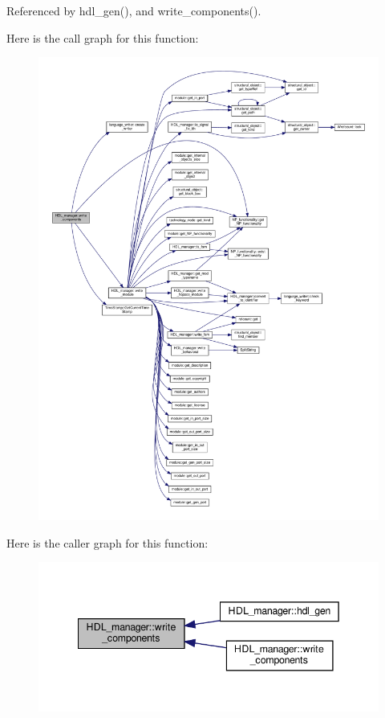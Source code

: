 Referenced by hdl\+\_\+gen(), and write\+\_\+components().

Here is the call graph for this function\+:
\nopagebreak
\begin{figure}[H]
\begin{center}
\leavevmode
\includegraphics[width=350pt]{d7/d32/classHDL__manager_aaaf408848659946f286bce9799a7da8a_cgraph}
\end{center}
\end{figure}
Here is the caller graph for this function\+:
\nopagebreak
\begin{figure}[H]
\begin{center}
\leavevmode
\includegraphics[width=342pt]{d7/d32/classHDL__manager_aaaf408848659946f286bce9799a7da8a_icgraph}
\end{center}
\end{figure}
\mbox{\label{classHDL__manager_a0bc13e709384a03c49b4130be2035c92}} 
